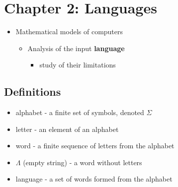 \section{Chapter 2: Languages}

\begin{itemize}
    \item Mathematical models of computers
    \begin{itemize}
        \item Analysis of the input \textbf{language}
        \begin{itemize}
            \item study of their limitations
        \end{itemize}
    \end{itemize}
\end{itemize}

\subsection{Definitions}
\begin{itemize}
    \item alphabet - a finite set of symbols, denoted $\Sigma$
    \item letter - an element of an alphabet
    \item word - a finite sequence of letters from the alphabet
    \item $\Lambda$ (empty string) - a word without letters
    \item language - a set of words formed from the alphabet
\end{itemize}